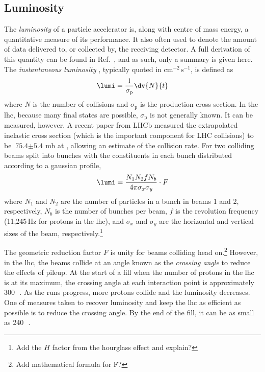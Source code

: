 \subsection{Luminosity}
\label{subsec:luminosity}

The \emph{\gls{luminosity}} of a particle accelerator is, along with centre of mass energy, a quantitative measure of its performance. It also often used to denote the amount of data delivered to, or collected by, the receiving detector. A full derivation of this quantity can be found in Ref.~, and as such, only a summary is given here. The \emph{instantaneous luminosity} \lumi, typically quoted in $\text{cm}^{-2}\,\text{s}^{-1}$, is defined as
\begin{equation}
    \lumi = \frac{1}{\sigma_{\mathrm{p}}} \dv{N}{t}
    \label{eq:lumi_instantaneous}
\end{equation}
where $N$ is the number of collisions and $\sigma_{\mathrm{p}}$ is the production cross section. In the \acrshort{lhc}, because many final states are possible, $\sigma_{\mathrm{p}}$ is not generally known. It can be measured, however. A recent paper from LHCb measured the extrapolated inelastic cross section (which is the important component for LHC collisions) to be $\text{75.4} \pm \text{5.4}$\,mb at \comruntwo \cite{Aaij:2018okq}, allowing an estimate of the collision rate. For two colliding beams split into bunches with the constituents in each bunch distributed according to a gaussian profile,
\begin{equation}
    \lumi = \frac{N_1 N_2 f N_b}{4 \pi \sigma_x \sigma_y} \cdot F %
    \label{eq:lumi_inst_head_on_colliding_beams}
\end{equation}
where $N_1$ and $N_2$ are the number of particles in a bunch in beams 1 and 2, respectively, $N_b$ is the number of bunches per beam, $f$ is the revolution frequency (11,245\,Hz for protons in the \acrshort{lhc}), and $\sigma_x$ and $\sigma_y$ are the horizontal and vertical sizes of the beam, respectively.\footnote{Add the $H$ factor from the hourglass effect and explain?}

The geometric reduction factor $F$ is unity for beams colliding head on.\footnote{Add mathematical formula for F?} However, in the \acrshort{lhc}, the beams collide at an angle known as the \emph{crossing angle} to reduce the effects of \gls{pileup}. At the start of a fill when the number of protons in the \acrshort{lhc} is at its maximum, the crossing angle at each interaction point is approximately 300\,\si{\micro{}}. As the runs progress, more protons collide and the luminosity decreases. One of measures taken to recover luminosity and keep the \acrshort{lhc} as efficient as possible is to reduce the crossing angle. By the end of the fill, it can be as small as 240\,\si{\micro{}}.

